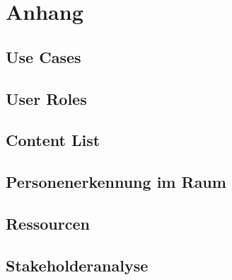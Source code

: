 
\section{Anhang}


\subsection{Use Cases}
\label{anhang:Use_Cases}

\clearpage

\clearpage

\subsection{User Roles}
\label{anhang:User_Roles}

\clearpage

\subsection{Content List}
\label{anhang:Content_List}

\clearpage

\subsection{Personenerkennung im Raum}
\label{anhang:Personenerkennung_im_Raum}

\clearpage

\subsection{Ressourcen}
\label{anhang:Ressourcen}
\clearpage

\subsection{Stakeholderanalyse}
\label{anhang:Stakeholderanalyse}
\clearpage